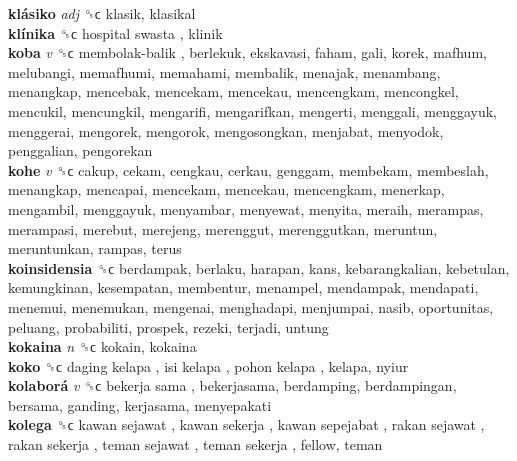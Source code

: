 \textbf{klásiko} \emph{adj}  ␝ϲ  klasik, klasikal  \\
\textbf{klínika} ␝ϲ   hospital swasta , klinik  \\
\textbf{koba} \emph{v}  ␝ϲ   membolak-balik , berlekuk, ekskavasi, faham, gali, korek, mafhum, melubangi, memafhumi, memahami, membalik, menajak, menambang, menangkap, mencebak, mencekam, mencekau, mencengkam, mencongkel, mencukil, mencungkil, mengarifi, mengarifkan, mengerti, menggali, menggayuk, menggerai, mengorek, mengorok, mengosongkan, menjabat, menyodok, penggalian, pengorekan  \\
\textbf{kohe} \emph{v}  ␝ϲ  cakup, cekam, cengkau, cerkau, genggam, membekam, membeslah, menangkap, mencapai, mencekam, mencekau, mencengkam, menerkap, mengambil, menggayuk, menyambar, menyewat, menyita, meraih, merampas, merampasi, merebut, merejeng, merenggut, merenggutkan, meruntun, meruntunkan, rampas, terus  \\
\textbf{koinsidensia} ␝ϲ  berdampak, berlaku, harapan, kans, kebarangkalian, kebetulan, kemungkinan, kesempatan, membentur, menampel, mendampak, mendapati, menemui, menemukan, mengenai, menghadapi, menjumpai, nasib, oportunitas, peluang, probabiliti, prospek, rezeki, terjadi, untung  \\
\textbf{kokaina} \emph{n}  ␝ϲ  kokain, kokaina  \\
\textbf{koko} ␝ϲ   daging kelapa ,  isi kelapa ,  pohon kelapa , kelapa, nyiur  \\
\textbf{kolaborá} \emph{v}  ␝ϲ   bekerja sama , bekerjasama, berdamping, berdampingan, bersama, ganding, kerjasama, menyepakati  \\
\textbf{kolega} ␝ϲ   kawan sejawat ,  kawan sekerja ,  kawan sepejabat ,  rakan sejawat ,  rakan sekerja ,  teman sejawat ,  teman sekerja , fellow, teman  \\
